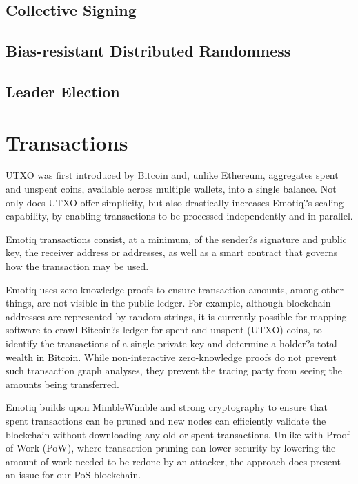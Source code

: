 \documentclass{yellowpaper}
\begin{document}
\subsection{Collective Signing}

\subsection{Bias-resistant Distributed Randomness}

\subsection{Leader Election}

\section{Transactions}
UTXO was first introduced by Bitcoin and, unlike Ethereum, aggregates spent and unspent coins, available across multiple wallets, into a single balance. Not only does UTXO offer simplicity, but also drastically increases Emotiq?s scaling capability, by enabling transactions to be processed independently and in parallel.

Emotiq transactions consist, at a minimum, of the sender?s signature and public key, the receiver address or addresses, as well as a smart contract that governs how the transaction may be used.

Emotiq uses zero-knowledge proofs to ensure transaction amounts, among other things, are not visible in the public ledger. For example, although blockchain addresses are represented by random strings, it is currently possible for mapping software to crawl Bitcoin?s ledger for spent and unspent (UTXO) coins, to identify the transactions of a single private key and determine a holder?s total wealth in Bitcoin. While non-interactive zero-knowledge proofs do not prevent such transaction graph analyses, they prevent the tracing party from seeing the amounts being transferred.

Emotiq builds upon MimbleWimble and strong cryptography to ensure that spent transactions can be pruned and new nodes can efficiently validate the blockchain without downloading any old or spent transactions. Unlike with Proof-of-Work (PoW),  where transaction pruning can lower security by lowering the amount of work needed to be redone by an attacker, the approach does present an issue for our PoS blockchain.

\end{document}
